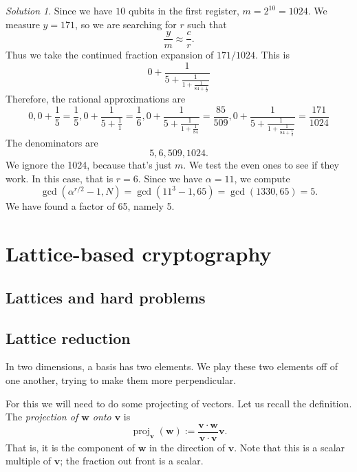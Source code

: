 \documentclass{article}
\theoremstyle{plain}
\theoremstyle{definition}
\theoremstyle{remark}
\newtheorem*{solution}{Solution}
\numberwithin{theorem}{section}
\begin{document}
\begin{enumerate}
    \begin{solution}
    Since we have $10$ qubits in the first register, $m = 2^{10} = 1024$.  We measure $y=171$, so we are searching for $r$ such that
    \[
        \frac{y}{m} \approx \frac{c}{r}.
    \]
    Thus we take the continued fraction expansion of $171/1024$.  This is
    \[
    0 + \frac{1}{
    5 + \frac{1}{
    1 + \frac{1}{
    84 + \frac{1}{
    2
    }
    }
    }
    }
    \]
    Therefore, the rational approximations are
    \[
    0 ,
    0 + \frac{1}{
    5 
    } = \frac{1}{5},
    0 + \frac{1}{
    5 + \frac{1}{
    1 
    }
    } = \frac{1}{6},
    0 + \frac{1}{
    5 + \frac{1}{
    1 + \frac{1}{
    84 
    }
    }
    }
     = \frac{85}{509},
    0 + \frac{1}{
    5 + \frac{1}{
    1 + \frac{1}{
    84 + \frac{1}{
    2
    }
    }
    }
    } = \frac{171}{1024}
    \]
    The denominators are
    \[
    5, 6, 509, 1024.
    \]
    We ignore the 1024, because that's just $m$.  We test the even ones to see if they work.  In this case, that is $r=6$.  Since we have $\alpha = 11$, we compute
    \[
    \gcd(\alpha^{r/2}-1,N)
    = \gcd(11^3-1, 65) = \gcd(1330,65) = 5.
    \]
    We have found a factor of 65, namely 5.
    \end{solution}
\end{enumerate}



\section{Lattice-based cryptography}

\subsection{Lattices and hard problems}

\subsection{Lattice reduction}

In two dimensions, a basis has two elements.  We play these two elements off of one another, trying to make them more perpendicular.

For this we will need to do some projecting of vectors.  Let us recall the definition.  The \emph{projection of $\mathbf{w}$ onto $\mathbf{v}$} is
\[
\operatorname{proj}_\mathbf{v}(\mathbf{w}) := \frac{ \mathbf{v} \cdot \mathbf{w} }{ \mathbf{v} \cdot \mathbf{v} } \mathbf{v}.
\]
That is, it is the component of $\mathbf{w}$ in the direction of $\mathbf{v}$.  Note that this is a scalar multiple of $\mathbf{v}$; the fraction out front is a scalar.
\end{document}

